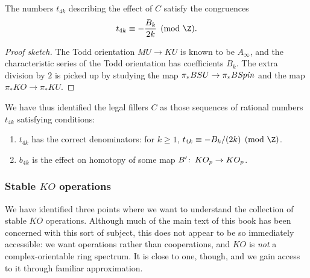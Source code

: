 \begin{corollary}
The numbers $t_{4k}$ describing the effect of $C$ satisfy the congruences \[t_{4k} \equiv -\frac{B_k}{2k} \pmod{\Z}.\]
\end{corollary}
\begin{proof}[Proof sketch]
The Todd orientation $MU \to KU$ is known to be $A_\infty$, and the characteristic series of the Todd orientation has coefficients $B_k$.  The extra division by $2$ is picked up by studying the map $\pi_* BSU \to \pi_* B\mathit{Spin}$ and the map $\pi_* KO \to \pi_* KU$.
\end{proof}

We have thus identified the legal fillers $C$ as those sequences of rational numbers $t_{4k}$ satisfying conditions:
\begin{enumerate}
    \item $t_{4k}$ has the correct denominators: for $k \ge 1$, $t_{4k} \equiv -B_k/(2k) \pmod{\Z}$.
    \item $b_{4k}$ is the effect on homotopy of some map $B'\colon\thinspace KO_p \to KO_p$.
\end{enumerate}


\subsubsection{Stable $KO$ operations}
\newcommand{\cts}{\mathrm{cts}}

We have identified three points where we want to understand the collection of stable $KO$ operations.  Although much of the main text of this book has been concerned with this sort of subject, this does not appear to be so immediately accessible: we want operations rather than cooperations, and $KO$ is \emph{not} a complex-orientable ring spectrum.  It is close to one, though, and we gain access to it through familiar approximation.

